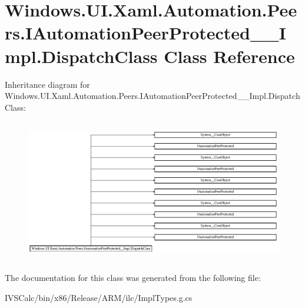 \hypertarget{class_windows_1_1_u_i_1_1_xaml_1_1_automation_1_1_peers_1_1_i_automation_peer_protected_____impl_1_1_dispatch_class}{}\section{Windows.\+U\+I.\+Xaml.\+Automation.\+Peers.\+I\+Automation\+Peer\+Protected\+\_\+\+\_\+\+Impl.\+Dispatch\+Class Class Reference}
\label{class_windows_1_1_u_i_1_1_xaml_1_1_automation_1_1_peers_1_1_i_automation_peer_protected_____impl_1_1_dispatch_class}
Inheritance diagram for Windows.\+U\+I.\+Xaml.\+Automation.\+Peers.\+I\+Automation\+Peer\+Protected\+\_\+\+\_\+\+Impl.\+Dispatch\+Class\+:\begin{figure}[H]
\begin{center}
\leavevmode
\includegraphics[height=6.285715cm]{class_windows_1_1_u_i_1_1_xaml_1_1_automation_1_1_peers_1_1_i_automation_peer_protected_____impl_1_1_dispatch_class}
\end{center}
\end{figure}


The documentation for this class was generated from the following file\+:\begin{DoxyCompactItemize}
\item 
I\+V\+S\+Calc/bin/x86/\+Release/\+A\+R\+M/ilc/Impl\+Types.\+g.\+cs\end{DoxyCompactItemize}
